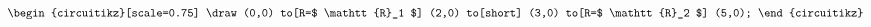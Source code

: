 \[\begin{circuitikz}[scale=0.75]
    \draw (0,0)
    to[R=$ \mathtt{R}_1 $] (2,0)
    to[short] (3,0)
    to[R=$ \mathtt{R}_2 $] (5,0);
  \end{circuitikz}\]